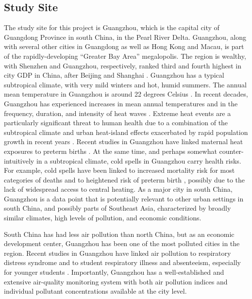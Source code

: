 \subsection{Study Site}

The study site for this project is Guangzhou, which is the capital city
of Guangdong Province in south China, in the Pearl River Delta.
Guangzhou, along with several other cities in Guangdong as well as Hong
Kong and Macau, is part of the rapidly-developing ``Greater Bay Area''
megalopolis. The region is wealthy, with Shenzhen and Guangzhou,
respectively, ranked third and fourth highest in city GDP in China,
after Beijing and Shanghai \autocite{buchholz_infographic_2019}. Guangzhou has a typical
subtropical climate, with very mild winters and hot, humid summers. The
annual mean temperature in Guangzhou is around 22 degrees Celsius
\autocite{climate-dataorg_guangzhou_2020}. In recent decades, Guangzhou has experienced increases in mean annual temperatures and in the frequency, duration, and intensity of heat waves \autocite{zhang_trends_2017}. Extreme heat events are a particularly significant threat to human health due to a combination of the subtropical climate and urban heat-island effects exacerbated by rapid population growth in recent years \autocite{zhang_trends_2017}. Recent studies in Guangzhou have linked maternal heat exposures to preterm births \autocite{he_ambient_2016, wang_independent_2020}. At the same time, and perhaps somewhat counter-intuitively in a subtropical climate, cold spells in Guangzhou carry health risks.  For example, cold spells have  been linked to increased mortality risk for most categories of deaths and to heightened risk of preterm birth \autocite{Chen_2021,he_ambient_2016}, possibly due to the lack of widespread access to central heating. As a major city in south China, Guangzhou is a data point that is potentially relevant to other urban settings in south China, and possibly parts of Southeast Asia, characterized by broadly similar climates, high levels of pollution, and economic conditions.

South China has had less air pollution than north China, but as an economic development center, Guangzhou has been one of the most polluted cities in the region.  Recent studies in Guangzhou have linked air pollution to respiratory distress syndrome and to student respiratory illness and absenteeism, especially for younger students \autocite{chen_air_2018, lin_ambient_2018}.
Importantly, Guangzhou has a well-established and extensive air-quality
monitoring system with both air pollution indices and individual
pollutant concentrations available at the city level.

